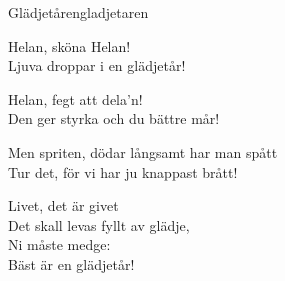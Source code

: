 \begin{song}{Glädjetåren}{gladjetaren}
\begin{vers}
Helan, sköna Helan!\\
Ljuva droppar i en glädjetår!\\
\end{vers}
\begin{vers}
Helan, fegt att dela'n!\\
Den ger styrka och du bättre mår!\\
\end{vers}
\begin{vers}
Men spriten, dödar långsamt har man spått\\
Tur det, för vi har ju knappast brått!\\
\end{vers}
\begin{vers}
Livet, det är givet\\
Det skall levas fyllt av glädje, \\
Ni måste medge:\\
Bäst är en glädjetår!\\
\end{vers}
\end{song}
